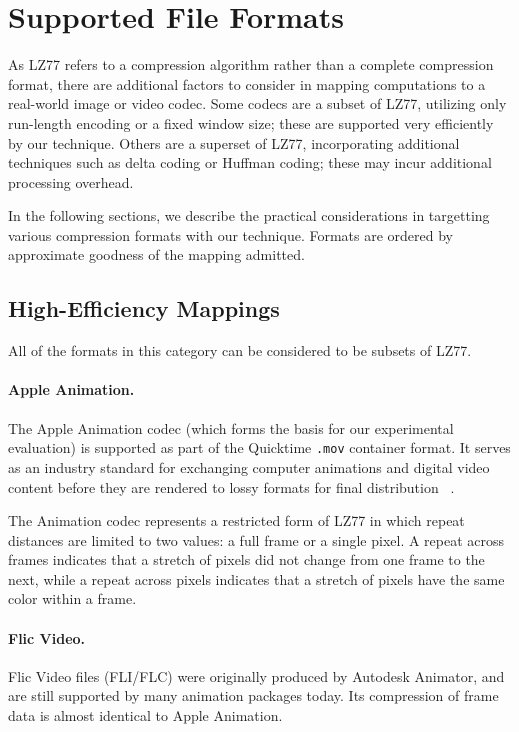\section{Supported File Formats}
\label{sec:formats}

As LZ77 refers to a compression algorithm rather than a complete
compression format, there are additional factors to consider in
mapping computations to a real-world image or video codec.  Some
codecs are a subset of LZ77, utilizing only run-length encoding or a
fixed window size; these are supported very efficiently by our
technique.  Others are a superset of LZ77, incorporating additional
techniques such as delta coding or Huffman coding; these may incur
additional processing overhead.

In the following sections, we describe the practical considerations in
targetting various compression formats with our technique.  Formats
are ordered by approximate goodness of the mapping admitted.

\subsection{High-Efficiency Mappings}
\label{sec:formats-good}

All of the formats in this category can be considered to be subsets of
LZ77.

\paragraph{Apple Animation.}  
The Apple Animation codec (which forms the basis for our experimental
evaluation) is supported as part of the Quicktime {\tt .mov} container
format.  It serves as an industry standard for exchanging computer
animations and digital video content before they are rendered to lossy
formats for final distribution~\cite[p.~106]{adobe-anim}\cite[p.~284]{harrington-anim} \cite[p.~367]{long-anim}\cite[p.~280]{pogue-anim}.

The Animation codec represents a restricted form of LZ77 in which
repeat distances are limited to two values: a full frame or a single
pixel.  A repeat across frames indicates that a stretch of pixels did
not change from one frame to the next, while a repeat across pixels
indicates that a stretch of pixels have the same color within a frame.

\paragraph{Flic Video.}
Flic Video files (FLI/FLC) were originally produced by Autodesk
Animator, and are still supported by many animation packages today.
Its compression of frame data is almost identical to Apple Animation.

